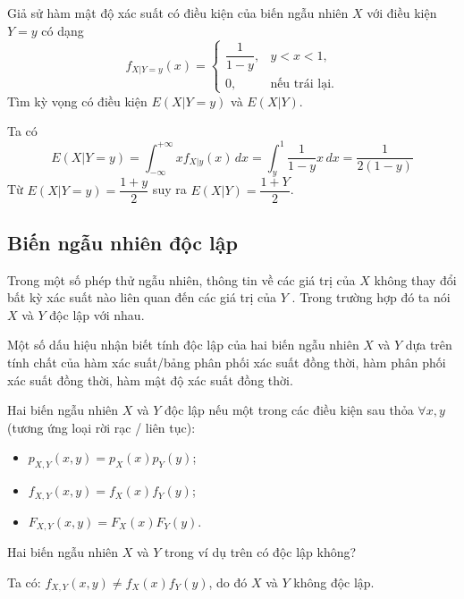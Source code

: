 \documentclass[12pt,a4paper]{article}
\begin{document}
\begin{vidu}
Giả sử hàm mật độ xác suất có điều kiện của biến ngẫu nhiên $X$ với điều kiện $Y = y$ có dạng
\[
  f_{X|Y =y}(x) = \begin{cases}
    \dfrac{1}{1-y}, & y < x < 1, \\
    0, & \text{nếu trái lại}.
  \end{cases}
\]
Tìm kỳ vọng có điều kiện $E(X|Y = y)$ và $E(X|Y)$.

Ta có
\[
  E(X|Y = y) = \int_{-\infty}^{+\infty} x f_{X|y}(x) \, dx = \int_{y}^{1} \dfrac{1}{1-y} x \, dx = \dfrac{1}{2(1-y)}
\]
Từ $E(X|Y = y) = \dfrac{1+y}{2}$ suy ra $E(X|Y) = \dfrac{1+Y}{2}$.
\end{vidu}

\subsection{Biến ngẫu nhiên độc lập}

\begin{dinhnghia}
Trong một số phép thử ngẫu nhiên, thông tin về các giá trị của $X$ không thay đổi bất kỳ xác suất nào liên quan đến các giá trị của $Y$ . Trong trường hợp đó ta nói $X$ và $Y$ độc lập với nhau.

Một số dấu hiệu nhận biết tính độc lập của hai biến ngẫu nhiên $X$ và $Y$ dựa trên tính chất của hàm xác suất/bảng phân phối xác suất đồng thời, hàm phân phối xác suất đồng thời, hàm mật độ xác suất đồng thời.
\end{dinhnghia}

\begin{dinhnghia}
Hai biến ngẫu nhiên $X$ và $Y$ độc lập nếu một trong các điều kiện sau thỏa $\forall x, y$ (tương ứng loại rời rạc / liên tục):
\begin{itemize}
  \item $p_{X,Y}(x, y) = p_X(x)p_Y(y)$;
  \item $f_{X,Y}(x, y) = f_X(x)f_Y(y)$;
  \item $F_{X,Y}(x, y) = F_X(x)F_Y(y)$.
\end{itemize}
\end{dinhnghia}

\begin{vidu}
Hai biến ngẫu nhiên $X$ và $Y$ trong ví dụ trên có độc lập không?

Ta có: $f_{X,Y}(x, y) \neq f_X(x)f_Y(y)$, do đó $X$ và $Y$ không độc lập.
\end{vidu}
\end{document}
